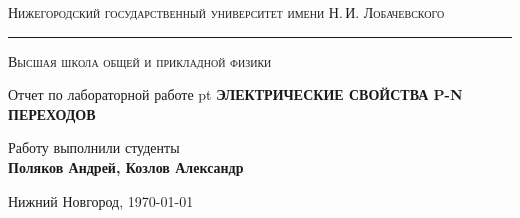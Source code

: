 \begin{titlepage}
	\begin{center}
	{\small\textsc{Нижегородский государственный университет имени Н.\,И. Лобачевского}}
	\vskip 2pt \hrule \vskip 3pt
	{\small\textsc{Высшая школа общей и прикладной физики}}

	\vfill


	{{\large Отчет по лабораторной работе} pt {\Large \bfseries ЭЛЕКТРИЧЕСКИЕ СВОЙСТВА P-N ПЕРЕХОДОВ}}

		
	\vspace{2cm}
	{\large Работу выполнили студенты \\[0.5em]{\Large \bfseries Поляков Андрей, Козлов Александр}}

	\end{center}

	\vfill

	\begin{center}
	{Нижний Новгород, \today}
	\end{center}
\end{titlepage}